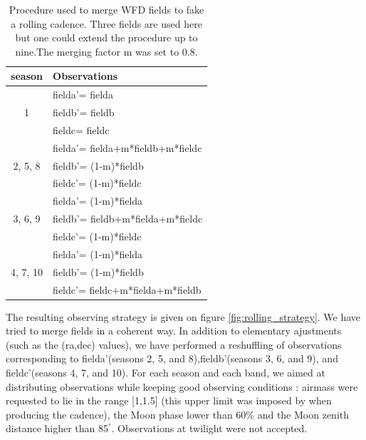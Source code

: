 \documentclass[\docopts]{\docclass}
\newcommand{\fia}{fielda}
\newcommand{\fib}{fieldb}
\newcommand{\fic}{fieldc}
\newcommand{\fiap}{fielda'}
\newcommand{\fibp}{fieldb'}
\newcommand{\ficp}{fieldc'}
\begin{document}
\begin{table}[t]
\begin{center}
\caption{Procedure used to merge WFD fields to fake a rolling
  cadence. Three fields are used here but one could extend the
  procedure up to nine.The merging factor m was set to 0.8.}
\label{tab:rolling_cadence}
\begin{tabular}{c|l}
\hline
\hline
    season   &      Observations \\
\hline
       & \fiap = \fia \\
    1 & \fibp = \fib \\
       & \fic = \fic \\
\hline
               & \fiap = \fia+m*\fib+m*\fic \\
    2, 5, 8 & \fibp = (1-m)*\fib \\
               & \ficp = (1-m)*\fic \\
\hline
               & \fiap = (1-m)*\fia \\
    3, 6, 9 & \fibp = \fib +m*\fia+m*\fic\\
              & \ficp = (1-m)*\fic \\
\hline
                 & \fiap = (1-m)*\fia\\
    4, 7, 10 & \fibp = (1-m)*\fib \\
                 & \ficp = \fic +m*\fia+m*\fib\\
\hline
\end{tabular}
\end{center}
\end{table}

The resulting observing strategy is given on figure
\ref{fig:rolling_strategy}. We have tried to merge fields in a coherent way. In addition to
elementary ajustments (such as the (ra,dec) values), we have performed
a reshuffling of observations corresponding to \fiap (seasons 2, 5,
and 8),\fibp (seasons 3, 6, and 9), and \ficp (seasons 4, 7, and
10). For each season and each band, we aimed at distributing
observations while keeping good observing conditions : airmass were
requested to lie in the range [1,1.5] (this upper limit was imposed by 
when producing the  cadence), the Moon phase lower
than 60\% and the Moon zenith distance higher than 85$^°$. Observations at twilight were not accepted.
\end{document}
